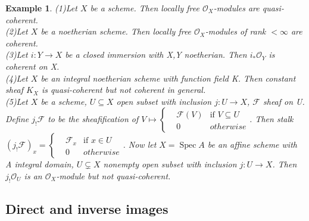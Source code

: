 \documentclass{ctexart}
\newtheorem{example}{Example}[section]
\newcommand{\spec}{\operatorname{Spec}}
\begin{document}
\begin{example}
    (1)Let $X$ be a scheme.
    Then locally free $\mathcal{O}_{X}$-modules are quasi-coherent. \\
    (2)Let $X$ be a noetherian scheme.
    Then locally free $\mathcal{O}_{X}$-modules of rank $< \infty$ are coherent. \\
    (3)Let $i: Y \longrightarrow X$ be a closed immersion with X,Y noetherian.
    Then $i_{\ast}\mathcal{O}_{Y}$ is coherent on X. \\
    (4)Let $X$ be an integral noetherian scheme with function field K.
    Then constant sheaf $K_{X}$ is quasi-coherent but not coherent in general. \\
    (5)Let $X$ be a scheme, $U \subseteq X$ open subset with inclusion $j: U \longrightarrow X$, $\mathcal{F}$ sheaf on U.
    Define $j_{!}\mathcal{F}$ to be the sheafification of $V \longmapsto
    \left\{
        \begin{aligned}
            & \mathcal{F}(V) & \text{if } V \subseteq U \\
            & 0 & otherwise
        \end{aligned}
    \right.
    $.
    Then stalk $(j_{!}\mathcal{F})_{x} =
    \left\{
        \begin{aligned}
            & \mathcal{F}_{x} & \text{if } x\in U \\
            & 0 & otherwise
        \end{aligned}
    \right.
    $.
    Now let $X = \spec A$ be an affine scheme with A integral domain, $U \subsetneq X$ nonempty open subset with inclusion $j: U \longrightarrow X$.
    Then $j_{!}\mathcal{O}_{U}$ is an $\mathcal{O}_{X}$-module but not quasi-coherent.
\end{example}

\subsection{Direct and inverse images}
\label{subsection:Sheaves_of_Modules_Direct_and_inverse_images}
\end{document}
